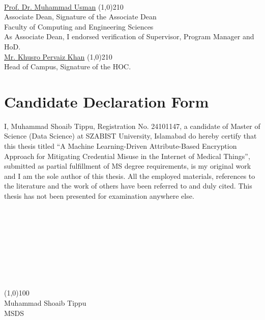 \documentclass[12pt,a4paper]{report}
\numberwithin{equation}{section}
\begin{document}
	\\[0.4cm]
	\underline{Prof. Dr. Muhammad Usman} \hspace{3.5cm} \line(1,0){210} \\
	Associate Dean,  \hspace{7cm} Signature of the Associate Dean\\
 Faculty of Computing and Engineering Sciences\\
\scriptsize As Associate Dean, I endorsed verification of Supervisor, Program Manager and HoD. \normalsize   \\[0.4cm] 
	\underline{Mr. Khusro Pervaiz Khan} \hspace{4.3cm} \line(1,0){210} \\
	Head of Campus,\hspace{8cm} Signature of the HOC. %
   

    
    \chapter*{Candidate Declaration Form} %
    \markboth{}{}
    \label{cha:declaration}
	\normalsize{ I, Muhammad Shoaib Tippu, Registration No. 24101147, a candidate of Master of Science (Data Science) at SZABIST University, Islamabad do hereby certify that this thesis titled ``A Machine Learning-Driven Attribute-Based Encryption Approach for Mitigating Credential Misuse in the Internet of Medical Things'', submitted as partial fulfillment of MS degree requirements, is my original work and I am the sole author of this thesis. All the employed materials, references to the literature and the work of others have been referred to and duly cited. This thesis has not been presented for examination anywhere else. \\ \\ \\ \\ \\ \\ \\ \\ \\

    \begin{flushright}
        \line(1,0){100} \\
        Muhammad Shoaib Tippu \\
        MSDS
    \end{flushright}
}
    \newpage
\end{document}
